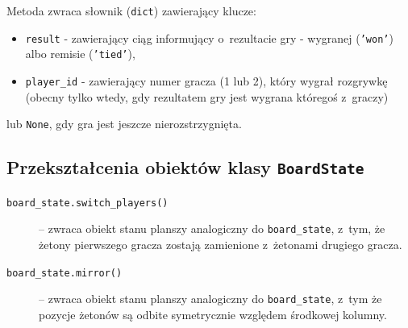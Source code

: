 \documentclass[a4paper, 12pt, oneside]{report}
\begin{document}
Metoda zwraca słownik (\texttt{dict}) zawierający klucze:
\begin{itemize}
\item \texttt{result} - zawierający ciąg informujący o~rezultacie gry - wygranej (\texttt{'won'}) albo remisie (\texttt{'tied'}),
\item \texttt{player\_id} - zawierający numer gracza (1 lub 2), który wygrał rozgrywkę (obecny tylko wtedy, gdy rezultatem gry jest wygrana któregoś z~graczy)
\end{itemize}

lub \texttt{None}, gdy gra jest jeszcze nierozstrzygnięta.

\subsection{Przekształcenia obiektów klasy \texttt{BoardState}}

\begin{sloppypar}
\begin{description}
\item[\texttt{board\_state.switch\_players()}] -- zwraca obiekt stanu planszy analogiczny do \texttt{board\_state}, z~tym, że żetony pierwszego gracza zostają zamienione z~żetonami drugiego gracza.
\item[\texttt{board\_state.mirror()}] -- zwraca obiekt stanu planszy analogiczny do \texttt{board\_state}, z~tym że pozycje żetonów są odbite symetrycznie względem środkowej kolumny.
\end{description}
\end{sloppypar}
\end{document}

